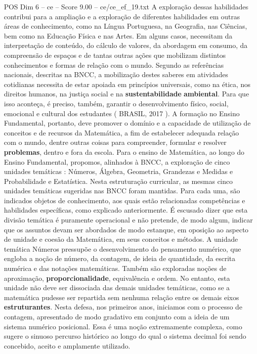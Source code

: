 \begin{textsample}{POS Dim 6 – ce – Score 9.00 – ce/ce\_ef\_19.txt}
A exploração dessas habilidades contribui para a ampliação e a exploração de diferentes habilidades em outras áreas de conhecimento, como na Língua Portuguesa, na Geografia, nas Ciências, bem como na Educação Física e nas Artes.
Em alguns casos, necessitam da interpretação de conteúdo, do cálculo de valores, da abordagem em consumo, da compreensão de espaços e de tantas outras ações que mobilizam distintos conhecimentos e formas de relação com o mundo.
Segundo as referências nacionais, descritas na BNCC, a mobilização destes saberes em atividades cotidianas necessita de estar apoiada em princípios universais, como na ética, nos direitos humanos, na justiça social e na \textbf{sustentabilidade} \textbf{ambiental}.
Para que isso aconteça, é preciso, também, garantir o desenvolvimento físico, social, emocional e cultural dos estudantes ( BRASIL, 2017 ).
A formação no Ensino Fundamental, portanto, deve promover o domínio e a capacidade de utilização de conceitos e de recursos da Matemática, a fim de estabelecer adequada relação com o mundo, dentre outras coisas para compreender, formular e resolver \textbf{problemas}, dentro e fora da escola.
Para o ensino de Matemática, ao longo do Ensino Fundamental, propomos, alinhados à BNCC, a exploração de cinco unidades temáticas : Números, Álgebra, Geometria, Grandezas e Medidas e Probabilidade e Estatística.
Nesta estruturação curricular, as mesmas cinco unidades temáticas sugeridas nas BNCC foram mantidas.
Para cada uma, são indicados objetos de conhecimento, aos quais estão relacionadas competências e habilidades específicas, como explicado anteriormente.
É escusado dizer que esta divisão temática é puramente operacional e não pretende, de modo algum, indicar que os assuntos devam ser abordados de modo estanque, em oposição ao aspecto de unidade e coesão da Matemática, em seus conceitos e métodos.
A unidade temática Números pressupõe o desenvolvimento do pensamento numérico, que engloba a noção de número, da contagem, de ideia de quantidade, da escrita numérica e das notações matemáticas.
Também são exploradas noções de aproximação, \textbf{proporcionalidade}, equivalência e ordem.
No entanto, esta unidade não deve ser dissociada das demais unidades temáticas, como se a matemática pudesse ser repartida sem nenhuma relação entre os demais eixos \textbf{estruturantes}.
Nesta defesa, nos primeiros anos, iniciamos com o processo de contagem, apresentado de modo gradativo em conjunto com a ideia de um sistema numérico posicional.
Essa é uma noção extremamente complexa, como sugere o sinuoso percurso histórico ao longo do qual o sistema decimal foi sendo concebido, aceito e amplamente utilizado.

\end{textsample}
